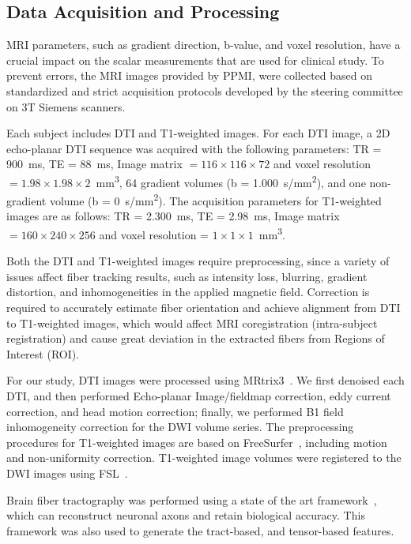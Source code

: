 \subsection{Data Acquisition and Processing}

\noindent MRI parameters, such as gradient direction, b-value, and voxel resolution, have a crucial impact on the scalar measurements that are used for clinical study. To prevent errors, the MRI images provided by PPMI, were collected based on standardized and strict acquisition protocols developed by the steering committee on 3T Siemens scanners.

Each subject includes DTI and T1-weighted images. For each DTI image, a 2D echo-planar DTI sequence was acquired with the following parameters: TR = \SI{900}{ms}, TE = \SI{88}{ms}, Image matrix $= 116\times116\times72$ and voxel resolution $ = 1.98\times1.98\times2$\SI{}{mm^3}, 64 gradient volumes (b = \SI{1,000}{s/mm^2}), and one non-gradient volume (b = \SI{0}{s/mm^2}). The acquisition parameters for T1-weighted images are as follows: TR = \SI{2,300}{ms}, TE = \SI{2.98}{ms}, Image matrix $= 160\times240\times256$ and voxel resolution = $ 1\times1\times1$\SI{}{mm^3}.

Both the DTI and T1-weighted images require preprocessing, since a variety of issues affect fiber tracking results, such as intensity loss, blurring, gradient distortion, and inhomogeneities in the applied magnetic field. Correction is required to accurately estimate fiber orientation and achieve alignment from DTI to T1-weighted images, which would affect MRI coregistration (intra-subject registration) and cause great deviation in the extracted fibers from Regions of Interest (ROI).


For our study, DTI images were processed using MRtrix3~\cite{mrtrix3}. We first denoised each DTI, and then performed Echo-planar Image/fieldmap correction, eddy current correction, and head motion correction; finally, we performed B1 field inhomogeneity correction for the DWI volume series. The preprocessing procedures for T1-weighted images are based on FreeSurfer~\cite{freesurfer}, including motion and non-uniformity correction. T1-weighted image volumes were registered to the DWI images using FSL~\cite{fsl}. %

Brain fiber tractography was performed using a state of the art framework~\cite{SMITH20121924}, which can reconstruct neuronal axons and retain biological accuracy. This framework was also used to generate the tract-based, and tensor-based features. 

